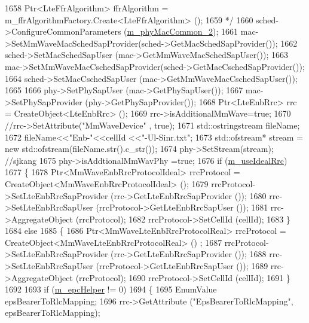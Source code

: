 \begin{DoxyCode}
1658 \textcolor{comment}{        Ptr<LteFfrAlgorithm> ffrAlgorithm = m\_ffrAlgorithmFactory.Create<LteFfrAlgorithm> ();}
1659 \textcolor{comment}{        */}
1660         sched->ConfigureCommonParameters (\hyperlink{classns3_1_1MmWaveHelper_ab4e9d2f9a49a485dadb3404e8c196f4c}{m\_phyMacCommon\_2});
1661         mac->SetMmWaveMacSchedSapProvider(sched->GetMacSchedSapProvider());
1662         sched->SetMacSchedSapUser (mac->GetMmWaveMacSchedSapUser());
1663         mac->SetMmWaveMacCschedSapProvider(sched->GetMacCschedSapProvider());
1664         sched->SetMacCschedSapUser (mac->GetMmWaveMacCschedSapUser());
1665 
1666         phy->SetPhySapUser (mac->GetPhySapUser());
1667         mac->SetPhySapProvider (phy->GetPhySapProvider());
1668         Ptr<LteEnbRrc> rrc = CreateObject<LteEnbRrc> ();
1669         rrc->isAdditionalMmWave=\textcolor{keyword}{true};
1670         \textcolor{comment}{//rrc->SetAttribute("MmWaveDevice" , true);}
1671         std::ostringstream fileName;
1672         fileName<<\textcolor{stringliteral}{"Enb-"}<<cellId <<\textcolor{stringliteral}{"-Ul-Sinr.txt"};
1673          std::ofstream* stream = \textcolor{keyword}{new} std::ofstream(fileName.str().c\_str());
1674          phy->SetStream(stream); \textcolor{comment}{//sjkang}
1675          phy->isAddtionalMmWavPhy =\textcolor{keyword}{true};
1676         \textcolor{keywordflow}{if} (\hyperlink{classns3_1_1MmWaveHelper_ad41fdb2996a6f53385b146bb60f476dc}{m\_useIdealRrc})
1677         \{
1678                 Ptr<MmWaveEnbRrcProtocolIdeal> rrcProtocol = CreateObject<MmWaveEnbRrcProtocolIdeal> ();
1679                 rrcProtocol->SetLteEnbRrcSapProvider (rrc->GetLteEnbRrcSapProvider ());
1680                 rrc->SetLteEnbRrcSapUser (rrcProtocol->GetLteEnbRrcSapUser ());
1681                 rrc->AggregateObject (rrcProtocol);
1682                 rrcProtocol->SetCellId (cellId);
1683         \}
1684         \textcolor{keywordflow}{else}
1685         \{
1686                 Ptr<MmWaveLteEnbRrcProtocolReal> rrcProtocol = CreateObject<MmWaveLteEnbRrcProtocolReal> ()
      ;
1687                 rrcProtocol->SetLteEnbRrcSapProvider (rrc->GetLteEnbRrcSapProvider ());
1688                 rrc->SetLteEnbRrcSapUser (rrcProtocol->GetLteEnbRrcSapUser ());
1689                 rrc->AggregateObject (rrcProtocol);
1690                 rrcProtocol->SetCellId (cellId);
1691         \}
1692 
1693         \textcolor{keywordflow}{if} (\hyperlink{classns3_1_1MmWaveHelper_a03b33f9a2480a4cdd8ffe697ccc08e9e}{m\_epcHelper} != 0)
1694         \{
1695                 EnumValue epsBearerToRlcMapping;
1696                 rrc->GetAttribute (\textcolor{stringliteral}{"EpsBearerToRlcMapping"}, epsBearerToRlcMapping);

\end{DoxyCode}
